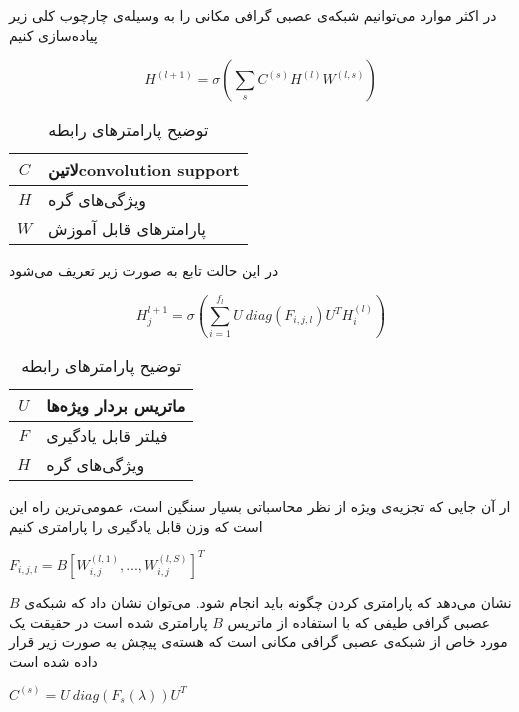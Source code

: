 در اکثر موارد می‌توانیم شبکه‌ی عصبی گرافی مکانی را به وسیله‌ی چارچوب کلی زیر پیاده‌سازی کنیم


\begin{equation}
  \label{eq:spatial}
H^{(l+1)}=\sigma(\sum_{s}C^{(s)}H^{(l)}W^{(l,s)})
\end{equation}


\begin{table}[h]
  \centering
  \caption{توضیح پارامترهای رابطه }
  \begin{tabular}{|c|p{}|}
    \hline
    $C$ & ‌لاتین{convolution support} \\
    \hline
    $H$ & ویژگی‌های گره \\
    \hline
    $W$ & پارامترهای قابل آموزش \\
    \hline
  \end{tabular}
  \label{tbl:distance}
\end{table}


در این حالت تابع به صورت زیر تعریف می‌شود


\begin{equation}
  \label{eq:spectral}
H_j^{l+1}=\sigma(\sum_{i=1}^{f_l}U\:diag(F_{i,j,l})U^TH_i^{(l)})
\end{equation}


\begin{table}[h]
  \centering
  \caption{توضیح پارامترهای رابطه }
  \begin{tabular}{|c|p{}|}
    \hline
    $U$ & ماتریس بردار ویژه‌ها \\
    \hline
    $F$ & فیلتر قابل یادگیری \\
    \hline
    $H$ & ویژگی‌های گره \\
    \hline
  \end{tabular}
  \label{tbl:distance}
\end{table}

ار آن جایی که تجزیه‌ی ویژه از نظر محاسباتی بسیار سنگین است، عمومی‌ترین راه این است که وزن قابل یادگیری را پارامتری کنیم

$F_{i,j,l}=B[W_{i,j}^{(l,1)},...,W_{i,j}^{(l,S)}]^T$

$B$ نشان می‌دهد که پارامتری کردن چگونه باید انجام شود. می‌توان نشان داد که شبکه‌ی عصبی گرافی طیفی که با استفاده از ماتریس $B$ پارامتری شده است در حقیقت یک مورد خاص از شبکه‌ی عصبی گرافی مکانی است که هسته‌ی پیچش به صورت زیر قرار داده شده است

$C^{(s)}=U\:diag(F_s(\lambda))U^T$

